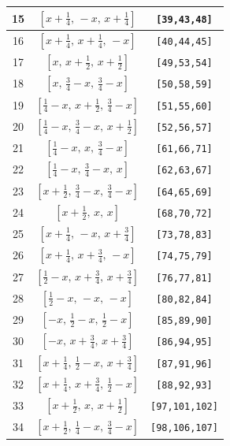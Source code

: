\documentclass[fleqn,8pt]{jsarticle}
\begin{document}
\begin{longtable}{ccc}
15 & $\left[ x + \frac{1}{4},\, - x,\, x + \frac{1}{4} \right]$ & {\tt [39,43,48]} \\ \hline
16 & $\left[ x + \frac{1}{4},\, x + \frac{1}{4},\, - x \right]$ & {\tt [40,44,45]} \\ \hline
17 & $\left[ x,\, x + \frac{1}{2},\, x + \frac{1}{2} \right]$ & {\tt [49,53,54]} \\ \hline
18 & $\left[ x,\, \frac{3}{4} - x,\, \frac{3}{4} - x \right]$ & {\tt [50,58,59]} \\ \hline
19 & $\left[ \frac{1}{4} - x,\, x + \frac{1}{2},\, \frac{3}{4} - x \right]$ & {\tt [51,55,60]} \\ \hline
20 & $\left[ \frac{1}{4} - x,\, \frac{3}{4} - x,\, x + \frac{1}{2} \right]$ & {\tt [52,56,57]} \\ \hline
21 & $\left[ \frac{1}{4} - x,\, x,\, \frac{3}{4} - x \right]$ & {\tt [61,66,71]} \\ \hline
22 & $\left[ \frac{1}{4} - x,\, \frac{3}{4} - x,\, x \right]$ & {\tt [62,63,67]} \\ \hline
23 & $\left[ x + \frac{1}{2},\, \frac{3}{4} - x,\, \frac{3}{4} - x \right]$ & {\tt [64,65,69]} \\ \hline
24 & $\left[ x + \frac{1}{2},\, x,\, x \right]$ & {\tt [68,70,72]} \\ \hline
25 & $\left[ x + \frac{1}{4},\, - x,\, x + \frac{3}{4} \right]$ & {\tt [73,78,83]} \\ \hline
26 & $\left[ x + \frac{1}{4},\, x + \frac{3}{4},\, - x \right]$ & {\tt [74,75,79]} \\ \hline
27 & $\left[ \frac{1}{2} - x,\, x + \frac{3}{4},\, x + \frac{3}{4} \right]$ & {\tt [76,77,81]} \\ \hline
28 & $\left[ \frac{1}{2} - x,\, - x,\, - x \right]$ & {\tt [80,82,84]} \\ \hline
29 & $\left[ - x,\, \frac{1}{2} - x,\, \frac{1}{2} - x \right]$ & {\tt [85,89,90]} \\ \hline
30 & $\left[ - x,\, x + \frac{3}{4},\, x + \frac{3}{4} \right]$ & {\tt [86,94,95]} \\ \hline
31 & $\left[ x + \frac{1}{4},\, \frac{1}{2} - x,\, x + \frac{3}{4} \right]$ & {\tt [87,91,96]} \\ \hline
32 & $\left[ x + \frac{1}{4},\, x + \frac{3}{4},\, \frac{1}{2} - x \right]$ & {\tt [88,92,93]} \\ \hline
33 & $\left[ x + \frac{1}{2},\, x,\, x + \frac{1}{2} \right]$ & {\tt [97,101,102]} \\ \hline
34 & $\left[ x + \frac{1}{2},\, \frac{1}{4} - x,\, \frac{3}{4} - x \right]$ & {\tt [98,106,107]} \\ \hline

\end{longtable}
\end{document}
